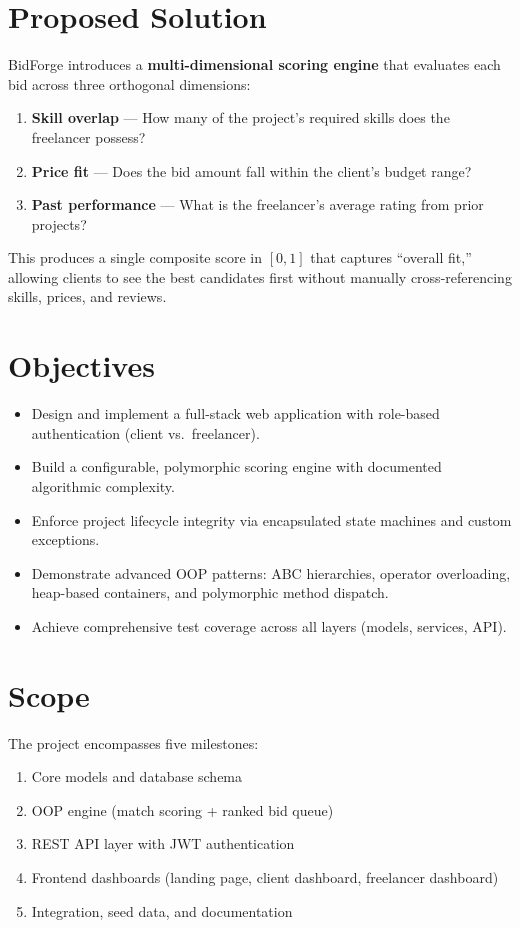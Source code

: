 \documentclass[12pt, a4paper]{report}
\begin{document}
\section{Proposed Solution}

BidForge introduces a \textbf{multi-dimensional scoring engine} that evaluates each bid across three orthogonal dimensions:

\begin{enumerate}[label=\arabic*.]
  \item \textbf{Skill overlap} --- How many of the project's required skills does the freelancer possess?
  \item \textbf{Price fit} --- Does the bid amount fall within the client's budget range?
  \item \textbf{Past performance} --- What is the freelancer's average rating from prior projects?
\end{enumerate}

This produces a single composite score in $[0, 1]$ that captures ``overall fit,'' allowing clients to see the best candidates first without manually cross-referencing skills, prices, and reviews.

\section{Objectives}

\begin{itemize}[leftmargin=2em]
  \item Design and implement a full-stack web application with role-based authentication (client vs.\ freelancer).
  \item Build a configurable, polymorphic scoring engine with documented algorithmic complexity.
  \item Enforce project lifecycle integrity via encapsulated state machines and custom exceptions.
  \item Demonstrate advanced OOP patterns: ABC hierarchies, operator overloading, heap-based containers, and polymorphic method dispatch.
  \item Achieve comprehensive test coverage across all layers (models, services, API).
\end{itemize}

\section{Scope}

The project encompasses five milestones:
\begin{enumerate}[label=\textbf{M\arabic*:}]
  \item Core models and database schema
  \item OOP engine (match scoring + ranked bid queue)
  \item REST API layer with JWT authentication
  \item Frontend dashboards (landing page, client dashboard, freelancer dashboard)
  \item Integration, seed data, and documentation
\end{enumerate}
\end{document}
